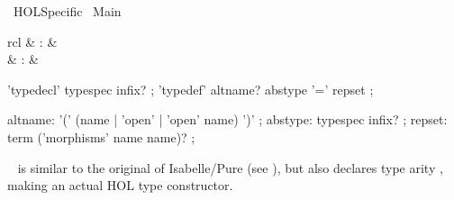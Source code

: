 %
\begin{isabellebody}%
\def\isabellecontext{HOL{\isacharunderscore}Specific}%
%
\isadelimtheory
%
\endisadelimtheory
%
\isatagtheory
{}\isamarkupfalse%
\ HOL{\isacharunderscore}Specific\isanewline
{}\ Main\isanewline
{}%
\endisatagtheory
{\isafoldtheory}%
%
\isadelimtheory
%
\endisadelimtheory
%
\isamarkuptrue%
%
\isamarkuptrue%
%
\begin{isamarkuptext}%
\begin{matharray}{rcl}
    \hypertarget{command.HOL.typedecl}{\hyperlink{command.HOL.typedecl}{\mbox{}}} & : &  \\
    \hypertarget{command.HOL.typedef}{\hyperlink{command.HOL.typedef}{\mbox{}}} & : &  \\
  \end{matharray}

  \begin{rail}
    'typedecl' typespec infix?
    ;
    'typedef' altname? abstype '=' repset
    ;

    altname: '(' (name | 'open' | 'open' name) ')'
    ;
    abstype: typespec infix?
    ;
    repset: term ('morphisms' name name)?
    ;
  \end{rail}

  \begin{description}
  
  \item \hyperlink{command.HOL.typedecl}{\mbox{}}~ is similar
  to the original \hyperlink{command.typedecl}{\mbox{}} of Isabelle/Pure (see
  ), but also declares type arity , making  an actual HOL type
  constructor.  %
  

\end{description}
\end{isamarkuptext}
\end{isabellebody}
